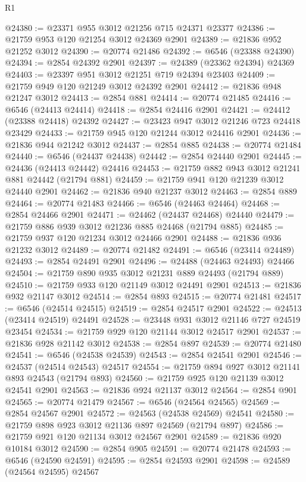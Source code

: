 \begin{lexlean}{R1}
\begin{coremodule}
@24380 := @23371 @955 @3012 @21256 @715 @24371 @23377
@24386 := @21759 @953 @120 @21254 @3012 @24369 @2901
@24389 := @21836 @952 @21252 @3012
@24390 := @20774 @21486
@24392 := @6546 (@23388 @24390)
@24394 := @2854 @24392 @2901
@24397 := @24389 (@23362 @24394) @24369
@24403 := @23397 @951 @3012 @21251 @719 @24394 @23403
@24409 := @21759 @949 @120 @21249 @3012 @24392 @2901
@24412 := @21836 @948 @21247 @3012
@24413 := @2854 @881
@24414 := @20774 @21485
@24416 := @6546 (@24413 @24414)
@24418 := @2854 @24416 @2901
@24421 := @24412 (@23388 @24418) @24392
@24427 := @23423 @947 @3012 @21246 @723 @24418 @23429
@24433 := @21759 @945 @120 @21244 @3012 @24416 @2901
@24436 := @21836 @944 @21242 @3012
@24437 := @2854 @885
@24438 := @20774 @21484
@24440 := @6546 (@24437 @24438)
@24442 := @2854 @24440 @2901
@24445 := @24436 (@24413 @24442) @24416
@24453 := @21759 @882 @943 @3012 @21241 @881 @24442 (@21794 @881)
@24459 := @21759 @941 @120 @21239 @3012 @24440 @2901
@24462 := @21836 @940 @21237 @3012
@24463 := @2854 @889
@24464 := @20774 @21483
@24466 := @6546 (@24463 @24464)
@24468 := @2854 @24466 @2901
@24471 := @24462 (@24437 @24468) @24440
@24479 := @21759 @886 @939 @3012 @21236 @885 @24468 (@21794 @885)
@24485 := @21759 @937 @120 @21234 @3012 @24466 @2901
@24488 := @21836 @936 @21232 @3012
@24489 := @20774 @21482
@24491 := @6546 (@23414 @24489)
@24493 := @2854 @24491 @2901
@24496 := @24488 (@24463 @24493) @24466
@24504 := @21759 @890 @935 @3012 @21231 @889 @24493 (@21794 @889)
@24510 := @21759 @933 @120 @21149 @3012 @24491 @2901
@24513 := @21836 @932 @21147 @3012
@24514 := @2854 @893
@24515 := @20774 @21481
@24517 := @6546 (@24514 @24515)
@24519 := @2854 @24517 @2901
@24522 := @24513 (@23414 @24519) @24491
@24528 := @23448 @931 @3012 @21146 @727 @24519 @23454
@24534 := @21759 @929 @120 @21144 @3012 @24517 @2901
@24537 := @21836 @928 @21142 @3012
@24538 := @2854 @897
@24539 := @20774 @21480
@24541 := @6546 (@24538 @24539)
@24543 := @2854 @24541 @2901
@24546 := @24537 (@24514 @24543) @24517
@24554 := @21759 @894 @927 @3012 @21141 @893 @24543 (@21794 @893)
@24560 := @21759 @925 @120 @21139 @3012 @24541 @2901
@24563 := @21836 @924 @21137 @3012
@24564 := @2854 @901
@24565 := @20774 @21479
@24567 := @6546 (@24564 @24565)
@24569 := @2854 @24567 @2901
@24572 := @24563 (@24538 @24569) @24541
@24580 := @21759 @898 @923 @3012 @21136 @897 @24569 (@21794 @897)
@24586 := @21759 @921 @120 @21134 @3012 @24567 @2901
@24589 := @21836 @920 @10184 @3012
@24590 := @2854 @905
@24591 := @20774 @21478
@24593 := @6546 (@24590 @24591)
@24595 := @2854 @24593 @2901
@24598 := @24589 (@24564 @24595) @24567

\end{coremodule}
\end{lexlean}
